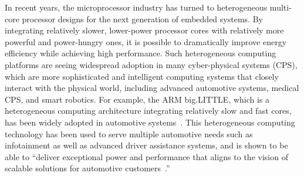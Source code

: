 
 In recent years, the microprocessor industry has turned to heterogeneous multi-core processor designs for the next generation of embedded systems. By integrating relatively slower, lower-power processor cores with relatively more powerful and power-hungry ones, it is possible to dramatically improve energy efficiency while achieving high performance. %
  Such heterogeneous computing platforms are seeing widespread adoption in many cyber-physical systems (CPS), which are more sophisticated and intelligent computing systems that closely interact with the physical world, including advanced automotive systems, medical CPS, and smart robotics. %
 For example, the ARM big.LITTLE, which is a heterogeneous computing architecture integrating relatively slow and fast cores, has been widely adopted in automotive systems~\cite{armvehicle1, armvehicle2}. This heterogeneous computing technology has been used to serve multiple automotive needs such as infotainment as well as advanced driver assistance systems, and is shown to be able to ``deliver exceptional power and performance that aligns to the vision of scalable solutions for automotive customers~\cite{armvehicle}.''
 
